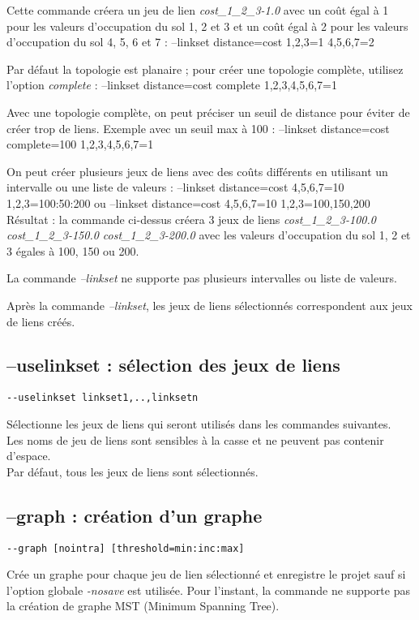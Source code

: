 \documentclass[a4paper,10pt]{report}
\newenvironment{cmd}
{\quote\Verbatim}
{\endVerbatim\endquote}
\begin{document}
Cette commande créera un jeu de lien \textit{cost\_1\_2\_3-1.0} avec un coût égal à 1 pour les valeurs d'occupation du sol 1, 2 et 3 et un coût égal à 2 pour les valeurs d'occupation du sol 4, 5, 6 et 7 :
\begin{cmd}
--linkset distance=cost 1,2,3=1 4,5,6,7=2
\end{cmd}

Par défaut la topologie est planaire ; pour créer une topologie complète, utilisez l'option \textit{complete} :
\begin{cmd}
--linkset distance=cost complete 1,2,3,4,5,6,7=1
\end{cmd}

Avec une topologie complète, on peut préciser un seuil de distance pour éviter de créer trop de liens. Exemple avec un seuil max à 100 :
\begin{cmd}
--linkset distance=cost complete=100 1,2,3,4,5,6,7=1
\end{cmd}

On peut créer plusieurs jeux de liens avec des coûts différents en utilisant un intervalle ou une liste de valeurs :
\begin{cmd}
--linkset distance=cost 4,5,6,7=10 1,2,3=100:50:200
ou
--linkset distance=cost 4,5,6,7=10 1,2,3=100,150,200
\end{cmd}
Résultat : la commande ci-dessus créera 3 jeux de liens \textit{cost\_1\_2\_3-100.0 cost\_1\_2\_3-150.0 cost\_1\_2\_3-200.0}
avec les valeurs d'occupation du sol 1, 2 et 3 égales à 100, 150 ou 200.

La commande \textit{--linkset} ne supporte pas plusieurs intervalles ou liste de valeurs.

Après la commande \textit{--linkset}, les jeux de liens sélectionnés correspondent aux jeux de liens créés.

\subsection{--uselinkset : sélection des jeux de liens}
\begin{verbatim}
--uselinkset linkset1,..,linksetn
\end{verbatim}
Sélectionne les jeux de liens qui seront utilisés dans les commandes suivantes.\\
Les noms de jeu de liens sont sensibles à la casse et ne peuvent pas contenir d'espace.\\
Par défaut, tous les jeux de liens sont sélectionnés.

\subsection{--graph : création d'un graphe}
\begin{verbatim}
--graph [nointra] [threshold=min:inc:max]
\end{verbatim}
Crée un graphe pour chaque jeu de lien sélectionné et enregistre le projet sauf si l'option globale \textit{-nosave} est utilisée.
Pour l'instant, la commande ne supporte pas la création de graphe MST (Minimum Spanning Tree).
\end{document}
